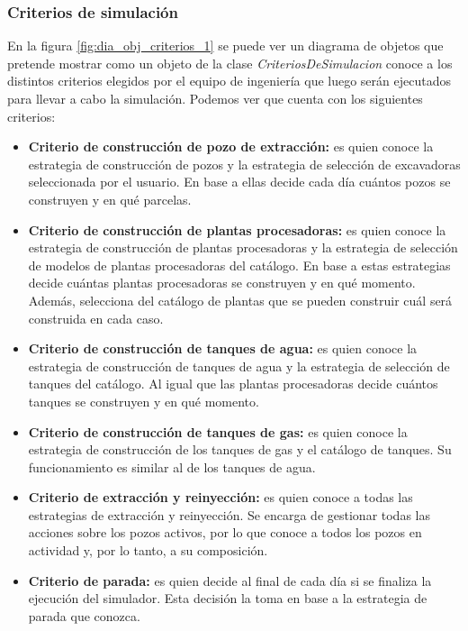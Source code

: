\newpage
\subsubsection{Criterios de simulación}
\label{sec:diseno_criterios}

\par En la figura \ref{fig:dia_obj_criterios_1} se puede ver un diagrama de objetos que pretende mostrar como un objeto de la clase \textit{CriteriosDeSimulacion} conoce a los distintos criterios elegidos por el equipo de ingeniería que luego serán ejecutados para llevar a cabo la simulación. Podemos ver que cuenta con los siguientes criterios:
\begin{itemize}
  \item \textbf{Criterio de construcción de pozo de extracción:} es quien conoce la estrategia de construcción de pozos y la estrategia de selección de excavadoras seleccionada por el usuario. En base a ellas decide cada día cuántos pozos se construyen y en qué parcelas.
  \item \textbf{Criterio de construcción de plantas procesadoras:} es quien conoce la estrategia de construcción de plantas procesadoras y la estrategia de selección de modelos de plantas procesadoras del catálogo. En base a estas estrategias decide cuántas plantas procesadoras se construyen y en qué momento. Además, selecciona del catálogo de plantas que se pueden construir cuál será construida en cada caso.
  \item \textbf{Criterio de construcción de tanques de agua:} es quien conoce la estrategia de construcción de tanques de agua y la estrategia de selección de tanques del catálogo. Al igual que las plantas procesadoras decide cuántos tanques se construyen y en qué momento. 
  \item \textbf{Criterio de construcción de tanques de gas:} es quien conoce la estrategia de construcción de los tanques de gas y el catálogo de tanques. Su funcionamiento es similar al de los tanques de agua.
  \item \textbf{Criterio de extracción y reinyección:} es quien conoce a todas las estrategias de extracción y reinyección. Se encarga de gestionar todas las acciones sobre los pozos activos, por lo que conoce a todos los pozos en actividad y, por lo tanto, a su composición.
  \item \textbf{Criterio de parada:} es quien decide al final de cada día si se finaliza la ejecución del simulador. Esta decisión la toma en base a la estrategia de parada que conozca.
\end{itemize}

